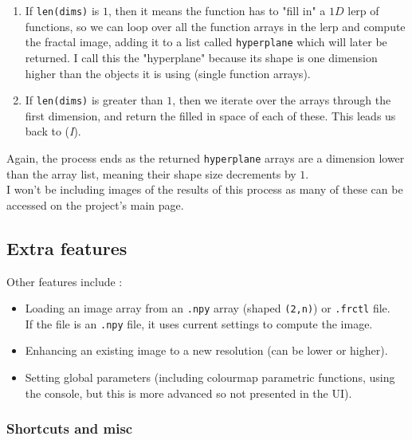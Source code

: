 \documentclass{article}
\begin{document}
\begin{enumerate}[label=(\textit{\Roman*})]
\item If \texttt{len(dims)} is $1$, then it means the function has to "fill in" a $1D$ lerp of functions, so we can loop over all the function arrays in the lerp and compute the fractal image, adding it to a list called \texttt{hyperplane} which will later be returned. I call this the "hyperplane" because its shape is one dimension higher than the objects it is using (single function arrays). \\
\item If \texttt{len(dims)} is greater than $1$, then we iterate over the arrays through the first dimension, and return the filled in space of each of these. This leads us back to (\textit{I}).
\end{enumerate}

Again, the process ends as the returned \texttt{hyperplane} arrays are a dimension lower than the array list, meaning their shape size decrements by $1$. \\
\vspace{5mm}
I won't be including images of the results of this process as many of these can be accessed on the project's main page.


\subsection{Extra features}

Other features include : \\
\begin{itemize}
\item Loading an image array from an \texttt{.npy} array (shaped \texttt{(2,n)}) or \texttt{.frctl} file. \\
If the file is an \texttt{.npy} file, it uses current settings to compute the image.
\item Enhancing an existing image to a new resolution (can be lower or higher). \\
\item Setting global parameters (including colourmap parametric functions, using the console, but this is more advanced so not presented in the UI). 
\end{itemize}

\subsubsection{Shortcuts and misc}
\end{document}
